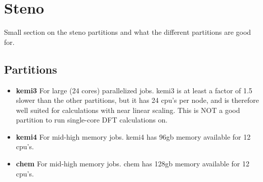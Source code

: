 \documentclass{article}
\begin{document}
\newpage
\section{Steno}

Small section on the steno partitions  and what the different partitions are good for.

\subsection*{Partitions}

\begin{itemize}

    \item {\bf kemi3} 
        For large (24 cores) parallelized jobs.
        kemi3 is at least a factor of 1.5 slower than the other partitions, but it has 24 cpu's per node, and is therefore well suited for calculations with near linear scaling.
        This is NOT a good partition to run single-core DFT calculations on.

    \item {\bf kemi4} 
        For mid-high memory jobs.
        kemi4 has 96gb memory available for 12 cpu's.

    \item {\bf chem} 
        For mid-high memory jobs.
        chem has 128gb memory available for 12 cpu's.

\end{itemize}



\end{document}
